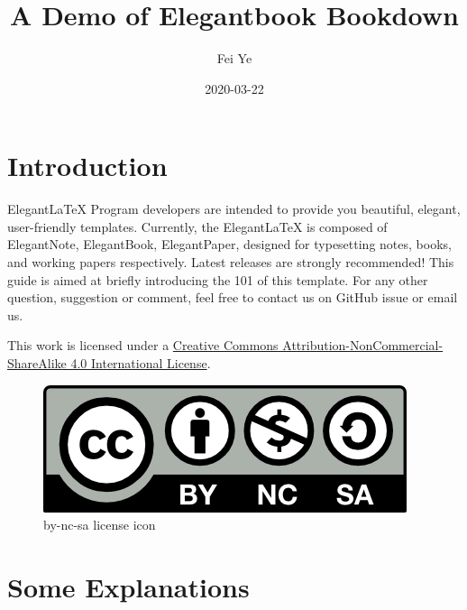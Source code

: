 \documentclass[en,11pt]{elegantbook}
\title{A Demo of Elegantbook Bookdown}
\author{Fei Ye}
\date{2020-03-22}
\renewcommand{\baselinestretch}{1.1}
\renewcommand{\baselinestretch}{0.975}
\begin{document}
\maketitle

{
\setcounter{tocdepth}{0}
\tableofcontents
}
\mainmatter

\hypersetup{pageanchor=true}

\renewcommand{\baselinestretch}{1.05}\normalsize

\captionsetup[figure]{labelformat=empty}
\captionsetup[subfigure]{labelformat=empty}

\hypertarget{introduction}{%
\chapter*{Introduction}\label{introduction}}

ElegantLaTeX Program developers are intended to provide you beautiful, elegant, user-friendly templates. Currently, the ElegantLaTeX is composed of ElegantNote, ElegantBook, ElegantPaper, designed for typesetting notes, books, and working papers respectively. Latest releases are strongly recommended! This guide is aimed at briefly introducing the 101 of this template. For any other question, suggestion or comment, feel free to contact us on GitHub issue or email us.

This work is licensed under a \href{https://creativecommons.org/licenses/by-nc-sa/4.0/}{Creative Commons Attribution-NonCommercial-ShareAlike 4.0 International License}.

\begin{figure}
\centering
\includegraphics{figs/by-nc-sa.png}
\caption{by-nc-sa license icon}
\end{figure}

\hypertarget{some-explanations}{%
\chapter{Some Explanations}\label{some-explanations}}
\end{document}
